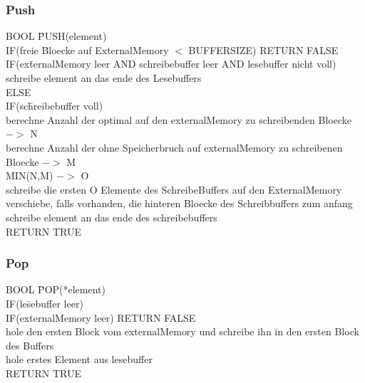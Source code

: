 \documentclass[10pt,a4paper]{article}
\begin{document}
\subsubsection{Push}
\begin{tabbing}
BOOL \= PUSH(element)\\
	\> IF(freie Bloecke auf ExternalMemory $<$ BUFFERSIZE) RETURN FALSE\\
	\> IF(ex\= ternalMemory leer AND schreibebuffer leer AND lesebuffer nicht voll)\\
		\>\> schreibe element an das ende des Lesebuffers\\
	\> ELSE\\
		\>\> IF(sc\= hreibebuffer voll)\\
			\>\>\> berechne Anzahl der optimal auf den externalMemory zu schreibenden Bloecke $->$ N\\
		\>\>\>	berechne Anzahl der ohne Speicherbruch auf externalMemory zu schreibenen Bloecke $->$ M\\
		\>\>\>	MIN(N,M) $->$ O\\
		\>\>\>	schreibe die ersten O Elemente des SchreibeBuffers auf den ExternalMemory\\
		\>\>\>	verschiebe, falls vorhanden, die hinteren Bloecke des Schreibbuffers zum anfang\\
		\>\> schreibe element an das ende des schreibebuffers\\
	\> RETURN TRUE\\
\end{tabbing}
\subsubsection{Pop}
\begin{tabbing}
BOOL \= POP(*element)\\
	\> IF(le\= sebuffer leer)\\
		\>\> IF(externalMemory leer) RETURN FALSE\\
		\>\> hole den ersten Block vom externalMemory und schreibe ihn in den ersten Block des Buffers\\
	\> hole erstes Element aus lesebuffer\\
	\> RETURN TRUE\\
\end{tabbing}
\end{document}
